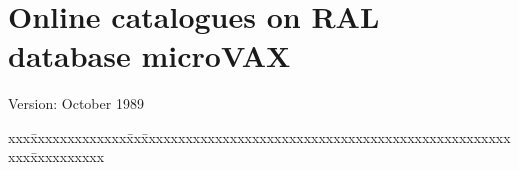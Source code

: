 \pagestyle{myheadings}

\setlength{\textwidth}{160mm}
\setlength{\textheight}{240mm}
\setlength{\topmargin}{-5mm}
\setlength{\oddsidemargin}{0mm}
\setlength{\evensidemargin}{0mm}
\setlength{\parindent}{0mm}
\setlength{\parskip}{\medskipamount}
\setlength{\unitlength}{1mm}



\appendix
\setcounter{page}{86}
\setcounter{section}{2}
\mbox{ }
\newpage
\section{Online catalogues on RAL database microVAX}
Version: October 1989
\begin{tabbing}
xxx\=xxxxxxxxxxxxx\=xx\=xxxxxxxxxxxxxxxxxxxxxxxxxxxxxxxxxxxxxxxxxxxxxxxxxxxxx\=xxxxxxxxxx\kill


\end{tabbing}
